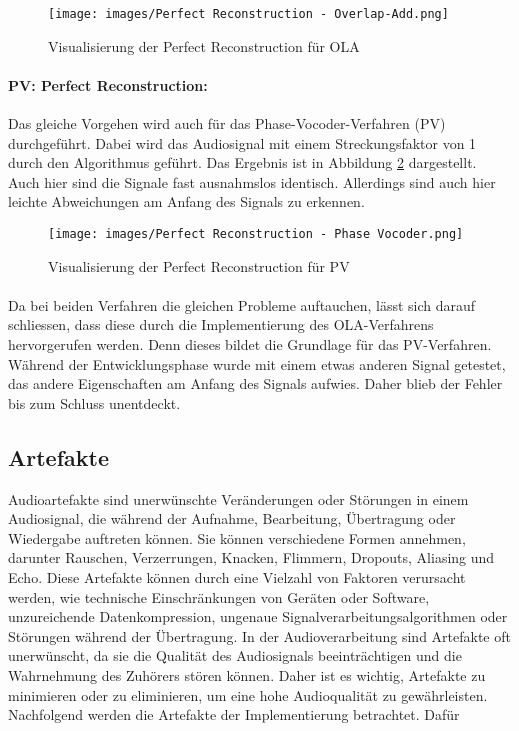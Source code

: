 \begin{figure}[H]
    \centering
    \texttt{[image: images/Perfect Reconstruction - Overlap-Add.png]}
    \caption{Visualisierung der Perfect Reconstruction für OLA}
\label{fig:pr-ola}
\end{figure}

\paragraph{PV: Perfect Reconstruction:}
Das gleiche Vorgehen wird auch für das Phase-Vocoder-Verfahren (PV) durchgeführt. Dabei wird das Audiosignal mit einem Streckungsfaktor von 1 durch den Algorithmus geführt. Das Ergebnis ist in Abbildung \ref{fig:pr-pv} dargestellt. Auch hier sind die Signale fast ausnahmslos identisch. Allerdings sind auch hier leichte Abweichungen am Anfang des Signals zu erkennen.

\begin{figure}[H]
    \centering
    \texttt{[image: images/Perfect Reconstruction - Phase Vocoder.png]}
    \caption{Visualisierung der Perfect Reconstruction für PV}
\label{fig:pr-pv}
\end{figure}

\paragraph{}
Da bei beiden Verfahren die gleichen Probleme auftauchen, lässt sich darauf schliessen, dass diese durch die Implementierung des OLA-Verfahrens hervorgerufen werden. Denn dieses bildet die Grundlage für das PV-Verfahren. Während der Entwicklungsphase wurde mit einem etwas anderen Signal getestet, das andere Eigenschaften am Anfang des Signals aufwies. Daher blieb der Fehler bis zum Schluss unentdeckt.

\subsection{Artefakte}
\label{sec:Artefakte}
Audioartefakte sind unerwünschte Veränderungen oder Störungen in einem Audiosignal, die während der Aufnahme, Bearbeitung, Übertragung oder Wiedergabe auftreten können. Sie können verschiedene Formen annehmen, darunter Rauschen, Verzerrungen, Knacken, Flimmern, Dropouts, Aliasing und Echo. Diese Artefakte können durch eine Vielzahl von Faktoren verursacht werden, wie technische Einschränkungen von Geräten oder Software, unzureichende Datenkompression, ungenaue Signalverarbeitungsalgorithmen oder Störungen während der Übertragung. In der Audioverarbeitung sind Artefakte oft unerwünscht, da sie die Qualität des Audiosignals beeinträchtigen und die Wahrnehmung des Zuhörers stören können. Daher ist es wichtig, Artefakte zu minimieren oder zu eliminieren, um eine hohe Audioqualität zu gewährleisten. Nachfolgend werden die Artefakte der Implementierung betrachtet. Dafür 


